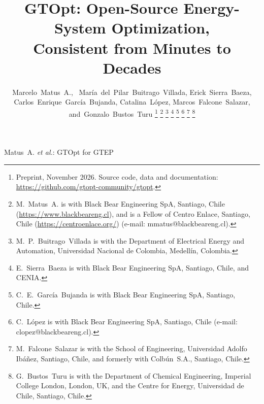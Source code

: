 \documentclass[journal]{IEEEtran}
\newcommand{\gtopt}{GTOpt}
\begin{document}
\title{%
  GTOpt: Open-Source Energy-System Optimization,\\
  Consistent from Minutes to Decades%
}

\author{%
  Marcelo~Matus~A.,~
  Mar\'ia~del~Pilar~Buitrago~Villada,
  Erick~Sierra~Baeza,
  Carlos~Enrique~Garc\'ia~Bujanda,
  Catalina~L\'opez,
  Marcos~Falcone~Salazar,
  and~Gonzalo~Bustos~Turu%
  \thanks{Preprint, November 2026.  Source code, data and documentation:
    \url{https://github.com/gtopt-community/gtopt}.}%
  \thanks{M.~Matus~A. is with Black Bear Engineering SpA, Santiago,
    Chile (\url{https://www.blackbeareng.cl}), and is a Fellow of
    Centro Enlace, Santiago, Chile (\url{https://centroenlace.org/})
    (e-mail: mmatus@blackbeareng.cl).}%
  \thanks{M.~P.~Buitrago~Villada is with the Department of Electrical
    Energy and Automation, Universidad Nacional de Colombia,
    Medell\'in, Colombia.}%
  \thanks{E.~Sierra~Baeza is with Black Bear Engineering SpA, Santiago,
    Chile, and CENIA.}%
  \thanks{C.~E.~Garc\'ia~Bujanda is with Black Bear Engineering SpA,
    Santiago, Chile.}%
  \thanks{C.~L\'opez is with Black Bear Engineering SpA, Santiago,
    Chile (e-mail: clopez@blackbeareng.cl).}%
  \thanks{M.~Falcone~Salazar is with the School of Engineering,
    Universidad Adolfo Ib\'a\~nez, Santiago, Chile, and formerly with
    Colb\'un~S.A., Santiago, Chile.}%
  \thanks{G.~Bustos~Turu is with the Department of Chemical Engineering,
    Imperial College London, London, UK, and the Centre for Energy,
    Universidad de Chile, Santiago, Chile.}%
}

%
  {Matus~A. \MakeLowercase{\textit{et al.}}: \gtopt{} for GTEP}

\maketitle
\end{document}
